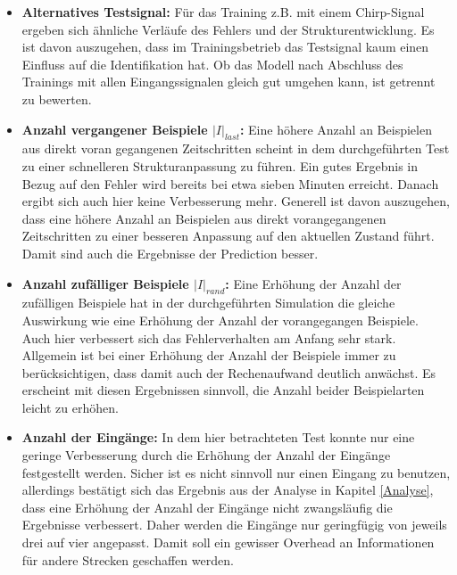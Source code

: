                 \begin{itemize}
                    \item \textbf{Alternatives Testsignal:} Für das Training z.B. mit einem Chirp-Signal ergeben sich ähnliche Verläufe des Fehlers und
                    der Strukturentwicklung. Es ist davon auszugehen, dass im Trainingsbetrieb das Testsignal kaum einen Einfluss auf die Identifikation hat. Ob 
                    das Modell nach Abschluss des Trainings mit allen Eingangssignalen gleich gut umgehen kann, ist getrennt zu bewerten.
                    \item \textbf{Anzahl vergangener Beispiele $|I|_{last}$:} Eine höhere Anzahl an Beispielen aus direkt voran gegangenen Zeitschritten scheint in dem durchgeführten 
                    Test zu einer schnelleren Strukturanpassung zu führen. Ein gutes Ergebnis in Bezug auf den Fehler wird bereits bei etwa sieben Minuten erreicht. Danach ergibt sich auch 
                    hier keine Verbesserung mehr. Generell ist davon auszugehen, dass eine höhere Anzahl an Beispielen aus direkt vorangegangenen Zeitschritten zu einer besseren 
                    Anpassung auf den aktuellen Zustand führt. Damit sind auch die Ergebnisse der Prediction besser. 
                    \item \textbf{Anzahl zufälliger Beispiele $|I|_{rand}$:} Eine Erhöhung der Anzahl der zufälligen Beispiele hat in der durchgeführten Simulation die gleiche 
                    Auswirkung wie eine Erhöhung der Anzahl der vorangegangen Beispiele. Auch hier verbessert sich das Fehlerverhalten am Anfang sehr stark. Allgemein ist bei einer Erhöhung
                    der Anzahl der Beispiele immer zu berücksichtigen, dass damit auch der Rechenaufwand deutlich anwächst. Es erscheint mit diesen Ergebnissen sinnvoll, die 
                    Anzahl beider Beispielarten leicht zu erhöhen.
                    \item \textbf{Anzahl der Eingänge:} In dem hier betrachteten Test konnte nur eine geringe Verbesserung durch die Erhöhung der Anzahl der Eingänge festgestellt werden. 
                    Sicher ist es nicht sinnvoll nur einen Eingang zu benutzen, allerdings bestätigt sich das Ergebnis aus der Analyse in Kapitel \ref{Analyse}, 
                    dass eine Erhöhung der Anzahl der Eingänge nicht zwangsläufig
                    die Ergebnisse verbessert. Daher werden die Eingänge nur geringfügig von jeweils drei auf vier angepasst. Damit soll ein gewisser Overhead an Informationen 
                    für andere Strecken geschaffen werden.

\end{itemize}
